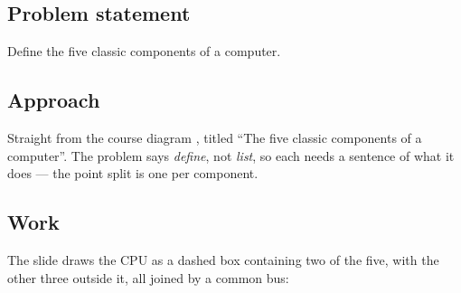 





\subsection*{Problem statement}

Define the five classic components of a computer.

\subsection*{Approach}

Straight from the course diagram , titled
``The five classic components of a computer''. The problem says \emph{define},
not \emph{list}, so each needs a sentence of what it does — the point split is
one per component.

\subsection*{Work}

The slide draws the CPU as a dashed box containing two of the five, with the
other three outside it, all joined by a common bus:

